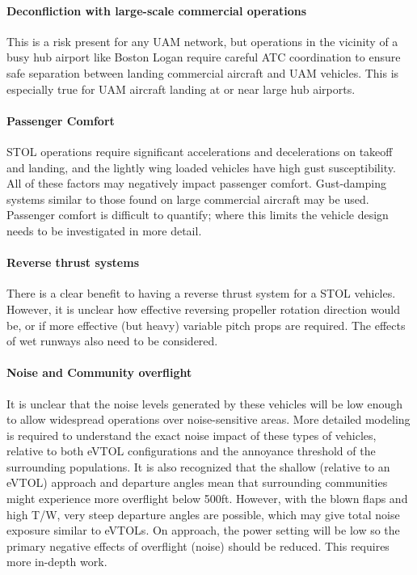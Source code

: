 \documentclass[]{aiaa-tc}%
\begin{document}
\paragraph{Deconfliction with large-scale commercial operations}
This is a risk present for any UAM network, but operations in the vicinity of a busy hub airport like Boston Logan require careful ATC coordination to ensure safe separation between landing commercial aircraft and UAM vehicles.   This is especially true for UAM aircraft landing at or near large hub airports. 
\paragraph{Passenger Comfort} STOL operations require significant accelerations and decelerations on takeoff and landing, and the lightly wing loaded vehicles have high gust susceptibility. All of these factors may negatively impact passenger comfort.  Gust-damping systems similar to those found on large commercial aircraft may be used.  Passenger comfort is difficult to quantify; where this limits the vehicle design needs to be investigated in more detail.
\paragraph{Reverse thrust systems} There is a clear benefit to having a reverse thrust system for a STOL vehicles.  However, it is unclear how effective reversing propeller rotation direction would be, or if more effective (but heavy) variable pitch props are required.  The effects of wet runways also need to be considered.  
\paragraph{Noise and Community overflight} It is unclear that the noise levels generated by these vehicles will be low enough to allow widespread operations over noise-sensitive areas. More detailed modeling is required to understand the exact noise impact of these types of vehicles, relative to both eVTOL configurations and the annoyance threshold of the surrounding populations.  It is also recognized that the shallow (relative to an eVTOL) approach and departure angles mean that surrounding communities might experience more overflight below 500ft.  However, with the blown flaps and high T/W, very steep departure angles are possible, which may give total noise exposure similar to eVTOLs.  On approach, the power setting will be low so the primary negative effects of overflight (noise) should be reduced.  This requires more in-depth work. 
\end{document}
